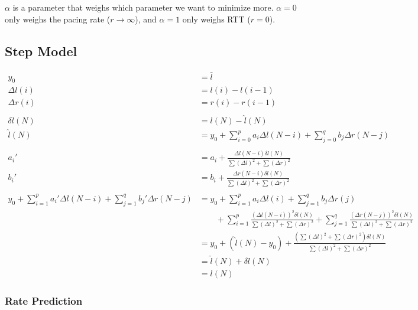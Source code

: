 \documentclass[12pt]{article}
\begin{document}
$\alpha$ is a parameter that weighs which parameter we want to minimize more.
$\alpha = 0$ only weighs the pacing rate ($r \to \infty$), and $\alpha = 1$
only weighs RTT ($r = 0$).

\pagebreak

\subsection{Step Model}

\begin{align*}
    y_0 &= \bar{l}\\
    \Delta l(i) &= l(i) - l(i - 1)\\
    \Delta r(i) &= r(i) - r(i - 1)\\
    \\
    \delta{l}(N) &= l(N) - \hat{l}(N)\\
    \hat{l}(N) &= y_0 + \sum_{i = 0}^p a_i \Delta l(N - i) + \sum_{j = 0}^q b_j \Delta r(N - j)\\
    \\
    a_i' &= a_i + \frac{\Delta l(N - i) \delta{l}(N)}{\sum (\Delta l)^2 + \sum (\Delta r)^2}\\
    b_i' &= b_i + \frac{\Delta r(N - i) \delta{l}(N)}{\sum (\Delta l)^2 + \sum (\Delta r)^2}\\
    \\
    y_0 +
    \sum_{i = 1}^p a_i' \Delta l(N - i) + \sum_{j = 1}^q b_j' \Delta r(N - j)
    &= y_0 +
    \sum_{i = 1}^p a_i \Delta l(i) + \sum_{j = 1}^q b_j \Delta r(j)\\
    &\qquad + \sum_{i = 1}^p \frac{(\Delta l(N - i))^2 \delta{l}(N)}{\sum (\Delta l)^2 + \sum (\Delta r)^2}
    + \sum_{j = 1}^q \frac{(\Delta r(N - j))^2 \delta{l}(N)}{\sum (\Delta l)^2 + \sum (\Delta r)^2}\\
    &= y_0 + (\hat{l}(N) - y_0)
    + \frac{(\sum (\Delta l)^2 + \sum (\Delta r)^2) \delta{l}(N)}{\sum (\Delta l)^2 + \sum (\Delta r)^2}\\
    &= \hat{l}(N) + \delta{l}(N)\\
    &= l(N)
\end{align*}

\subsubsection{Rate Prediction}
\end{document}
